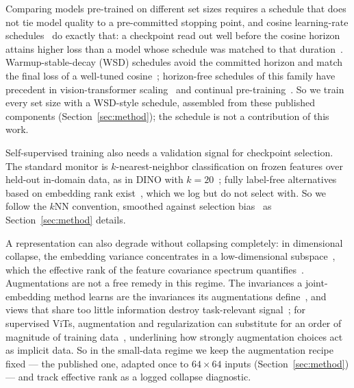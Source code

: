 Comparing models pre-trained on different set sizes requires a schedule that
does not tie model quality to a pre-committed stopping point, and cosine
learning-rate schedules~\cite{loshchilov2017sgdr} do exactly that: a
checkpoint read out well before the cosine horizon attains higher loss than a
model whose schedule was matched to that
duration~\cite{hoffmann2022chinchilla}. Warmup-stable-decay (WSD) schedules
avoid the committed horizon and match the final loss of a well-tuned
cosine~\cite{hagele2024scaling,hu2024minicpm}; horizon-free schedules of this
family have precedent in vision-transformer
scaling~\cite{zhai2022scalingvit} and continual
pre-training~\cite{singh2025beyond}. So we train every set size with a
WSD-style schedule, assembled from these published components
(Section~\ref{sec:method}); the schedule is not a contribution of this work.

Self-supervised training also needs a validation signal for checkpoint
selection. The standard monitor is $k$-nearest-neighbor classification on
frozen features over held-out in-domain data, as in DINO with
$k{=}20$~\cite{caron2021dino}; fully label-free alternatives based on
embedding rank exist~\cite{garrido2023rankme}, which we log but do not select
with. So we follow the $k$NN convention, smoothed against selection
bias~\cite{cawley2010overfitting} as Section~\ref{sec:method} details.

A representation can also degrade without collapsing completely: in
dimensional collapse, the embedding variance concentrates in a
low-dimensional subspace~\cite{jing2022dimensional}, which the effective rank
of the feature covariance spectrum quantifies~\cite{roy2007effective}.
Augmentations are not a free remedy in this regime. The invariances a
joint-embedding method learns are the invariances its augmentations
define~\cite{xiao2021what}, and views that share too little information
destroy task-relevant signal~\cite{tian2020infomin}; for supervised ViTs,
augmentation and regularization can substitute for an order of magnitude of
training data~\cite{steiner2022train}, underlining how strongly augmentation
choices act as implicit data. So in the small-data regime we keep the
augmentation recipe fixed --- the published one, adapted once to
$64\times64$ inputs (Section~\ref{sec:method}) --- and track effective rank
as a logged collapse diagnostic.
